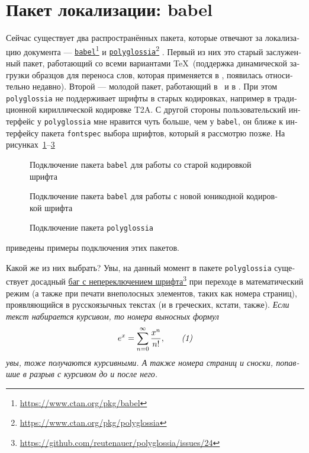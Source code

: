 \documentclass[a4paper,12pt]{article}
\newcommand\foothref[2]{%
  \href{#1}{#2}\footnote{\url{#1}}%
}
\newcommand\package[1]{\texttt{#1}}
\begin{document}
\section{Пакет локализации: babel}
Сейчас существует два распространённых пакета, которые отвечают за
локализацию документа ---
\foothref{https://www.ctan.org/pkg/babel}{\package{babel}} и
\foothref{https://www.ctan.org/pkg/polyglossia}{\package{polyglossia}}.
Первый из них это старый заслуженный пакет, работающий со всеми
вариантами \TeX\ (поддержка динамической загрузки образцов для
переноса слов, которая применяется в \LuaTeX, появилась относительно
недавно). Второй --- молодой пакет, работающий в \XeLaTeX\ и в \LuaLaTeX.
При этом \package{polyglossia} не поддерживает шрифты в старых кодировках,
например в традиционной кириллической кодировке T2A. С другой стороны
пользовательский интерфейс у \package{polyglossia} мне нравится чуть больше,
чем у \package{babel}, он ближе к интерфейсу пакета \package{fontspec}
выбора шрифтов, который я рассмотрю позже. На рисунках~\ref{babel1}--\ref{polygl1}
\begin{figure}[tp]
\begin{latexcode}
\usepackage[T2A]{fontenc}
\usepackage[utf8]{luainputenc}
\usepackage[english,russian]{babel}
\end{latexcode}
\caption{Подключение пакета \package{babel} для работы со старой кодировкой шрифта}\label{babel1}
\end{figure}
\begin{figure}[tp]
\begin{latexcode}
\usepackage[english,russian]{babel}
\end{latexcode}
\caption{Подключение пакета \package{babel} для работы с новой юникодной кодировкой шрифта}\label{babel2}
\end{figure}
\begin{figure}[tp]
\begin{latexcode}
\usepackage{polyglossia}
\setmainlanguage{russian}
\end{latexcode}
\caption{Подключение пакета \package{polyglossia}}\label{polygl1}
\end{figure}
приведены примеры подключения этих пакетов.

Какой же из них выбрать? Увы, на данный момент в пакете \package{polyglossia}
существует досадный \foothref{https://github.com/reutenauer/polyglossia/issues/24}{баг
с непереключением шрифта} при переходе в математический
режим (а также при печати внеполосных элементов, таких как номера страниц),
проявляющийся в русскоязычных текстах (и в греческих, кстати, также).
{\itshape Если текст набирается курсивом, то номера выносных формул
\begin{equation}
e^x=\sum_{n=0}^\infty\frac{x^n}{n!},\tag*{\textit{(1)}}
\end{equation}
увы, тоже получаются курсивными. А также номера страниц и сноски, попавшие
в разрыв с курсивом до и после него.}
\end{document}
